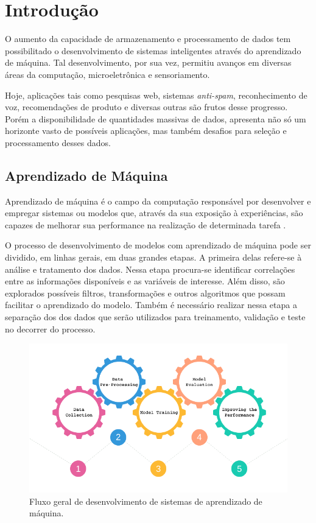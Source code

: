 \chapter[Introdução]{Introdução}

O aumento da capacidade de armazenamento e processamento de dados tem possibilitado o desenvolvimento de sistemas inteligentes através do aprendizado de máquina. Tal desenvolvimento, por sua vez, permitiu avanços em diversas áreas da computação, microeletrônica e sensoriamento. 

Hoje, aplicações tais como pesquisas web, sistemas \textit{anti-spam}, reconhecimento de voz, recomendações de produto e diversas outras são frutos desse progresso. Porém a disponibilidade de quantidades massivas de dados, apresenta não só um horizonte vasto de possíveis aplicações, mas também desafios para seleção e processamento desses dados.


\section{Aprendizado de Máquina}

Aprendizado de máquina é o campo da computação responsável por desenvolver e empregar sistemas ou modelos que, através da sua exposição à experiências, são capazes de melhorar sua performance na realização de determinada tarefa \cite{mitchell_1997}.

O processo de desenvolvimento de modelos com aprendizado de máquina pode ser dividido, em linhas gerais, em duas grandes etapas. A primeira delas refere-se à análise e tratamento dos dados. Nessa etapa procura-se identificar correlações entre as informações disponíveis e as variáveis de interesse. Além disso, são explorados possíveis filtros, transformações e outros algoritmos que possam facilitar o aprendizado do modelo. Também é necessário realizar nessa etapa a separação dos dos dados que serão utilizados para treinamento, validação e teste no decorrer do processo.

\begin{figure}[!htb]
    \caption{Fluxo geral de desenvolvimento de sistemas de aprendizado de máquina.}
    \begin{center}
    \includegraphics[width=\linewidth]{imgs/intro/MLFlow}
    \end{center}
    \label{fig:mlflow}
\end{figure}

